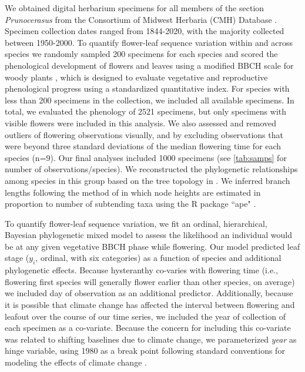 \documentclass{article}[12pt]
\begin{document}
We obtained digital herbarium specimens for all members of the section \textit{Prunocerasus} from the Consortium of Midwest Herbaria (CMH) Database \citep{CMH}. Specimen collection dates ranged from 1844-2020, with the majority collected between 1950-2000. To quantify flower-leaf sequence variation within and across species we randomly sampled 200 specimens for each species and scored the phenological development of flowers and leaves using a modified BBCH scale for woody plants \citep{Finn2007}, which is designed to evaluate vegetative and reproductive phenological progress using a standardized quantitative index. For species with less than 200 specimens in the collection, we included all available specimens. In total, we evaluated the phenology of 2521 specimens, but only specimens with visible flowers were included in this analysis. We also assessed and removed outliers of flowering observations visually, and by excluding observations that were beyond three standard deviations of the median flowering time for each species (n=9). Our final analyses included 1000 specimens (see \ref{tab:samps} for number of observations/species). We reconstructed the phylogenetic relationships among species in this group based on the tree topology in \citet{Shaw:2004aa}. We inferred branch lengths following the method of \citet{Granfen1989} in which node heights are estimated in proportion to number of subtending taxa using the R package ``ape" \citep{Paradis2019}.

To quantify flower-leaf sequence variation, we fit an ordinal, hierarchical, Bayesian phylogenetic mixed model \citep{Garamszegi2014} to assess the likelihood an individual would be at any given vegetative BBCH phase while flowering. Our model predicted leaf stage ($y_i$, ordinal, with six categories) as a function of species and additional phylogenetic effects. Because hysteranthy co-varies with flowering time (i.e., flowering first species will generally flower earlier than other species, on average) we included day of observation as an additional predictor. Additionally, because it is possible that climate change has affected the interval between flowering and leafout over the course of our time series, we included the year of collection of each specimen as a co-variate. Because the concern for including this co-variate was related to shifting baselines due to climate change, we parameterized \emph{year} as hinge variable, using 1980 as a break point following standard conventions for modeling the effects of climate change \citep{IPCC2013,Buonaiuto2020,Kharouba2018}.
\end{document}

